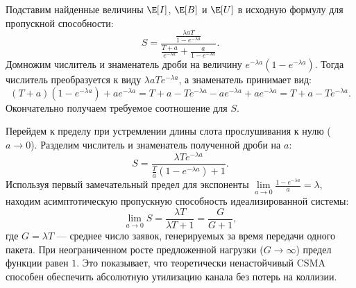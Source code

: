 \begin{sproof}
    Подставим найденные величины $\E[I]$, $\E[B]$ и $\E[U]$ в исходную формулу для пропускной способности:
    $$ S = \frac{\frac{\lambda a T}{1 - e^{-\lambda a}}}{\frac{T+a}{e^{-\lambda a}} + \frac{a}{1 - e^{-\lambda a}}}. $$
    Домножим числитель и знаменатель дроби на величину $e^{-\lambda a} (1 - e^{-\lambda a})$. Тогда числитель преобразуется к виду $\lambda a T e^{-\lambda a}$, а знаменатель принимает вид:
    $$ (T+a)(1 - e^{-\lambda a}) + a e^{-\lambda a} = T + a - T e^{-\lambda a} - a e^{-\lambda a} + a e^{-\lambda a} = T + a - T e^{-\lambda a}. $$
    Окончательно получаем требуемое соотношение для $S$.
\end{sproof}

\begin{conseq}
    Перейдем к пределу при устремлении длины слота прослушивания к нулю ($a \to 0$). Разделим числитель и знаменатель полученной дроби на $a$:
    $$ S = \frac{\lambda T e^{-\lambda a}}{\frac{T}{a}(1 - e^{-\lambda a}) + 1}. $$
    Используя первый замечательный предел для экспоненты $\lim\limits_{a \to 0} \frac{1 - e^{-\lambda a}}{a} = \lambda$, находим асимптотическую пропускную способность идеализированной системы:
    $$ \lim_{a \to 0} S = \frac{\lambda T}{\lambda T + 1} = \frac{G}{G + 1}, $$
    где $G = \lambda T$ — среднее число заявок, генерируемых за время передачи одного пакета. При неограниченном росте предложенной нагрузки ($G \to \infty$) предел функции равен $1$. Это показывает, что теоретически ненастойчивый CSMA способен обеспечить абсолютную утилизацию канала без потерь на коллизии.
\end{conseq}

\begin{center}
\end{center}